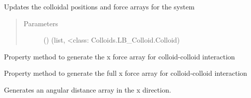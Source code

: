 \documentclass[letterpaper,10pt,english]{sphinxmanual}
\begin{document}
\begin{fulllineitems}
\begin{fulllineitems}
\end{fulllineitems}


\begin{fulllineitems}
\label{\detokenize{index:lb_colloids.Colloids.Colloid_Math.ColloidColloid.update}}
Updates the colloidal positions and force arrays for the system
\begin{quote}\begin{description}
\item[{Parameters}] \leavevmode
{} () \textendash{} (list, \textless{}class: Colloids.LB\_Colloid.Colloid)

\end{description}\end{quote}

\end{fulllineitems}


\begin{fulllineitems}
\label{\detokenize{index:lb_colloids.Colloids.Colloid_Math.ColloidColloid.x}}
Property method to generate the x force array for colloid-colloid interaction

\end{fulllineitems}


\begin{fulllineitems}
\label{\detokenize{index:lb_colloids.Colloids.Colloid_Math.ColloidColloid.x_array}}
Property method to generate the full x force array for colloid-colloid interaction

\end{fulllineitems}


\begin{fulllineitems}
\label{\detokenize{index:lb_colloids.Colloids.Colloid_Math.ColloidColloid.x_distance_array}}
Generates an angular distance array in the x direction.


\end{fulllineitems}
\end{fulllineitems}
\end{document}
